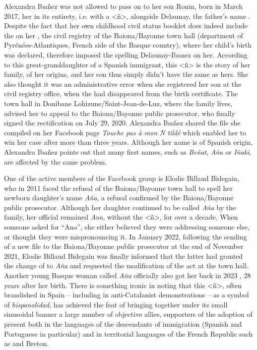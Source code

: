 \documentclass[output=paper,colorlinks,citecolor=brown]{langscibook}
\begin{document}
Alexandra Ibañez was not allowed to pass on to her son Ronin, born in March 2017, her  in its entirety, i.e. with a <ñ>, alongside Delaunay, the father's name \citep{sm:Serhani2017}. Despite the fact that her own childhood civil status booklet does indeed include the  on her , the civil registry of the Baiona/Bayonne town hall (department of Pyrénées-Atlantiques, French side of the Basque country), where her child's birth was declared, therefore imposed the spelling Delaunay-Ibanez on her. According to this great-granddaughter of a Spanish immigrant, this <ñ> is the story of her family, of her origins, and her son thus simply didn't have the same  as hers. She also thought it was an administrative error when she registered her son at the civil registry office, when the  had disappeared from the birth certificate. The town hall in Donibane Lohizune/Saint-Jean-de-Luz, where the family lives, advised her to appeal to the Baiona/Bayonne public prosecutor, who finally signed the rectification on July 29, 2020. Alexandra Ibañez shared the file she compiled on her Facebook page \textit{Touche pas à mon N tildé} which enabled her to win her case after more than three years. Although her name is of Spanish origin, Alexandra Ibañez points out that many  first names, such as \textit{Beñat}, \textit{Aña} or \textit{Iñaki}, are affected by the same problem. 

One of the active members of the Facebook group is Elodie Billaud Bidegain, who in 2011 faced the refusal of the Baiona\slash Bayonne town hall to spell her newborn daughter's name \textit{Aña}, a refusal confirmed by the Baiona\slash Bayonne public prosecutor. Although her daughter continued to be called \textit{Aña} by the family, her official  remained \textit{Ana}, without the <ñ>, for over a decade. When someone asked for “Ana”, she either believed they were addressing someone else, or thought they were mispronouncing it. In January 2022, following the sending of a new file to the Baiona/Bayonne public prosecutor at the end of November 2021, Elodie Billaud Bidegain was finally informed that the latter had granted the change of  to \textit{Aña} and requested the modification of the act at the town hall. Another young Basque woman called \textit{Aña} officially also got her  back in 2023 \citep{sm:Etxezaharreta2023}, 28 years after her birth. There is something ironic in noting that this <ñ>, often brandished in Spain – including in anti-Catalanist demonstrations – as a symbol of \textit{hispanolidad}, has achieved the feat of bringing together under its small sinusoidal banner a large number of objective allies, supporters of the adoption of  present both in the languages of the descendants of immigration (Spanish and Portuguese in particular) and in territorial languages of the French Republic such as  and Breton.
\end{document}
